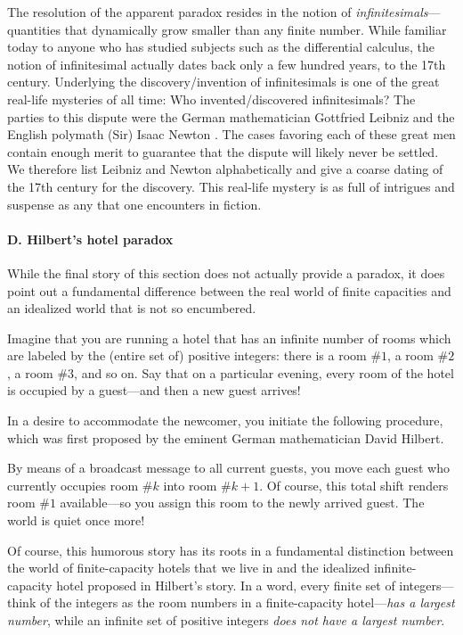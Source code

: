 The resolution of the apparent paradox resides in the notion of
 {\em infinitesimals}---quantities that
dynamically grow smaller than any finite number.  While familiar today
to anyone who has studied subjects such as the differential calculus,
the notion of infinitesimal actually dates back only a few hundred
years, to the 17th century.  Underlying the discovery/invention of
infinitesimals is one of the great real-life mysteries of all time:
Who invented/discovered infinitesimals? The parties to this dispute
were the German mathematician Gottfried Leibniz \cite{Leibniz}
 and the English polymath
(Sir) Isaac Newton \cite{Newton}.   The cases
favoring each of these great men contain enough merit to guarantee
that the dispute will likely never be settled.  We therefore list
Leibniz and Newton alphabetically and give a coarse dating of the 17th
century for the discovery.  This real-life mystery is as full of
intrigues and suspense as any that one encounters in fiction.


\paragraph{D. Hilbert's hotel paradox}

While the final story of this section does not actually provide a
paradox, it does point out a fundamental difference between the real
world of finite capacities and an idealized world that is not so
encumbered.

Imagine that you are running a hotel that has an infinite number of
rooms which are labeled by the (entire set of) positive integers:
there is a room \#$1$, a room \#$2$, a room \#$3$, and so on.  Say
that on a particular evening, every room of the hotel is occupied by a
guest---and then a new guest arrives!

In a desire to accommodate the newcomer, you initiate the following
procedure, which was first proposed by the eminent German
mathematician David Hilbert. 

By means of a broadcast message to all current guests, you move each
guest who currently occupies room \#$k$ into room \#$k+1$.  Of course,
this total shift renders room \#$1$ available---so you assign this
room to the newly arrived guest.  The world is quiet once more!

Of course, this humorous story has its roots in a fundamental
distinction between the world of finite-capacity hotels that we live
in and the idealized infinite-capacity hotel proposed in Hilbert's
story.  In a word, every finite set of integers---think of the
integers as the room numbers in a finite-capacity hotel---{\em has a
largest number}, while an infinite set of positive integers {\em
does not have a largest number}.


